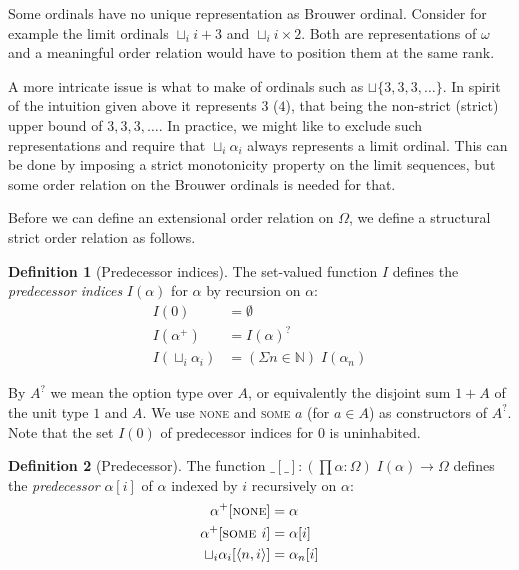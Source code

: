 \documentclass[11pt,oneside,a4paper,final]{report}
\theoremstyle{definition}
\newtheorem{definition}{Definition}
\begin{document}
Some ordinals have no unique representation as Brouwer ordinal. Consider for
example the limit ordinals $\sqcup_i i + 3$ and $\sqcup_i i \times 2$. Both
are representations of $\omega$ and a meaningful order relation would have to
position them at the same rank.

A more intricate issue is what to make of ordinals such as $\sqcup \{ 3, 3, 3,
\ldots \}$. In spirit of the intuition given above it represents $3$ ($4$),
that being the non-strict (strict) upper bound of $3, 3, 3, \ldots$.
In practice, we might like to exclude such representations and require that
$\sqcup_i \alpha_i$ always represents a limit ordinal. This can be done by
imposing a strict monotonicity property on the limit sequences, but some order
relation on the Brouwer ordinals is needed for that.


Before we can define an extensional order relation on $\Omega$, we define a
structural strict order relation as follows.

\begin{definition}[Predecessor indices]
The set-valued function $I$ defines the \emph{predecessor indices} $I(\alpha)$
for $\alpha$ by recursion on $\alpha$:
\begin{align*}
  I(0)                 &= \emptyset \\
  I(\alpha^+)          &= I(\alpha)^? \\
  I(\sqcup_i \alpha_i) &= (\Sigma n \in \mathbb{N}) \; I(\alpha_n)
\end{align*}
\end{definition}


By $A^?$ we mean the option type over $A$, or equivalently the disjoint sum
$1 + A$ of the unit type $1$ and $A$. We use \textsc{none} and \textsc{some
  $a$} (for $a \in A$) as constructors of $A^?$. Note that the set $I(0)$ of
predecessor indices for $0$ is uninhabited.

\begin{definition}[Predecessor]
The function $\_[\_] : (\prod \alpha : \Omega) \; I(\alpha) \rightarrow
\Omega$ defines the \emph{predecessor} $\alpha[i]$ of $\alpha$ indexed by $i$
recursively on $\alpha$:
\begin{align*}
  \alpha^+[\textsc{none}]                 &= \alpha \\
  \alpha^+[\textsc{some $i$}]             &= \alpha[i] \\
  \sqcup_i \alpha_i[\langle n, i \rangle] &= \alpha_n[i]
\end{align*}
\end{definition}
\end{document}
